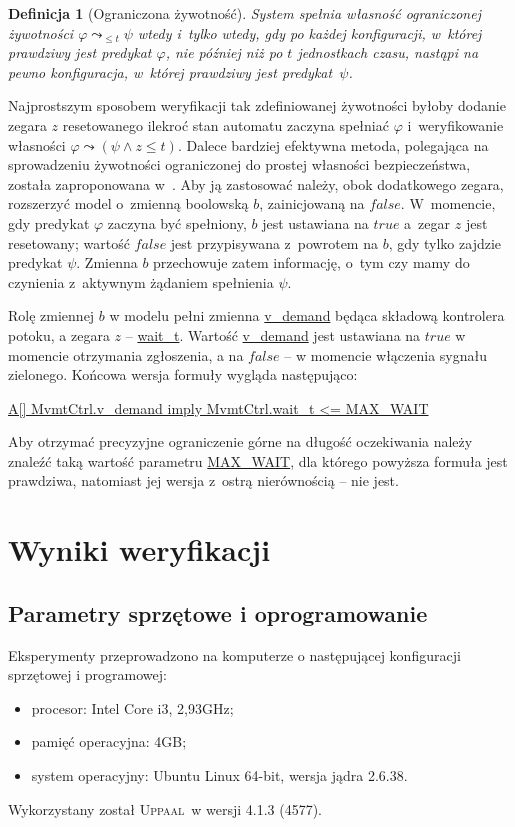 \documentclass{pracamgr}
\newcommand{\upp}{\textsc{Uppaal}}
\newcommand{\ttt}[1]{\url{#1}}
\newcommand{\tttform}[1]{
  \begin{center}
    \ttt{#1}
  \end{center}
}
\theoremstyle{plain}
\newtheorem{definition}{Definicja}
\begin{document}
\begin{definition}[Ograniczona żywotność]
  System spełnia własność ograniczonej żywotności $\varphi
  \leadsto_{\leq t} \psi $ wtedy i~tylko wtedy, gdy po każdej
  konfiguracji, w~której prawdziwy jest predykat $\varphi$, nie
  później niż po $t$ jednostkach czasu, nastąpi na pewno konfiguracja, w~której
  prawdziwy jest predykat~$\psi$.
\end{definition}
Najprostszym sposobem weryfikacji tak zdefiniowanej żywotności byłoby
dodanie zegara $z$ resetowanego ilekroć stan automatu zaczyna
spełniać $\varphi$ i~weryfikowanie własności \mbox{$\varphi \leadsto
  (\psi \land z\leq t)$}. Dalece bardziej efektywna metoda, polegająca
na sprowadzeniu żywotności ograniczonej do prostej własności
bezpieczeństwa, została zaproponowana w~\cite{lpw:tacas98}. Aby ją
zastosować należy, obok dodatkowego zegara, rozszerzyć model o~zmienną
boolowską $b$, zainicjowaną na $false$.  W~momencie, gdy predykat
$\varphi$ zaczyna być spełniony, $b$ jest ustawiana na $true$ a~zegar
$z$ jest resetowany; wartość $false$ jest przypisywana z~powrotem na
$b$, gdy tylko zajdzie predykat $\psi$. Zmienna $b$ przechowuje zatem
informację, o~tym czy mamy do czynienia z~aktywnym żądaniem spełnienia
$\psi$.

Rolę zmiennej $b$ w modelu pełni zmienna \ttt{v_demand} będąca składową
kontrolera potoku, a zegara $z$ -- \ttt{wait_t}. Wartość \ttt{v_demand}
jest ustawiana na $true$ w momencie otrzymania zgłoszenia, a na
$false$ -- w momencie włączenia sygnału zielonego. Końcowa wersja
formuły wygląda następująco:
\tttform{A[] MvmtCtrl.v_demand imply MvmtCtrl.wait_t <= MAX_WAIT}
Aby otrzymać precyzyjne ograniczenie górne na długość oczekiwania należy
znaleźć taką wartość parametru \ttt{MAX_WAIT}, dla którego powyższa formuła
jest prawdziwa, natomiast jej wersja z~ostrą nierównością -- nie jest.

\section{Wyniki weryfikacji}
\label{s:ver:results}
\subsection{Parametry sprzętowe i oprogramowanie}
Eksperymenty przeprowadzono na komputerze o następującej konfiguracji
sprzętowej i programowej:
\begin{itemize}
  \item procesor: Intel Core i3, 2,93GHz;
  \item pamięć operacyjna: 4GB;
  \item system operacyjny: Ubuntu Linux 64-bit, wersja jądra 2.6.38. 
\end{itemize}
Wykorzystany został \upp\ w wersji 4.1.3 (4577).
\end{document}
